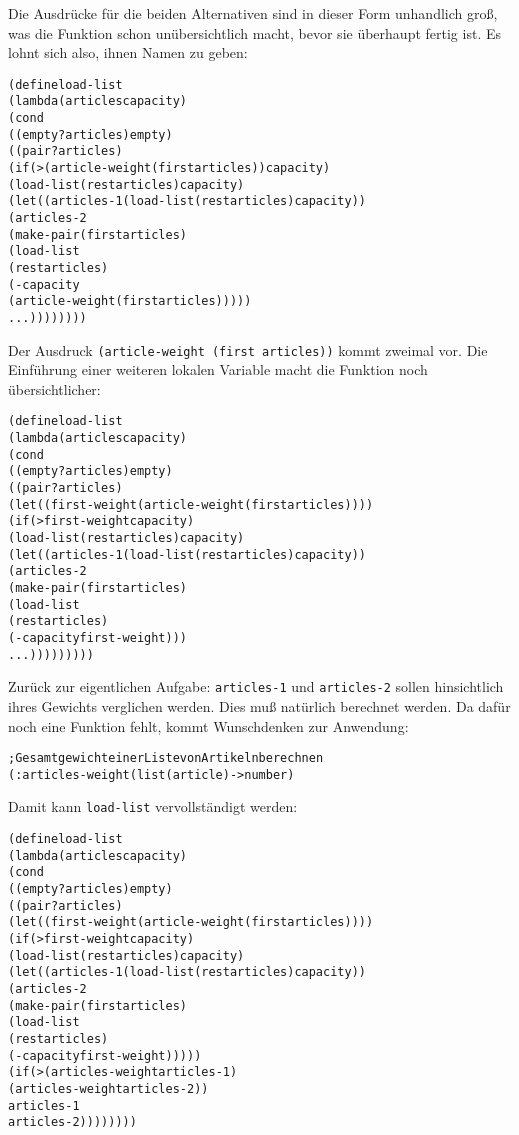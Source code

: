 %
Die Ausdrücke für die beiden Alternativen sind in dieser Form 
unhandlich groß, was die Funktion schon unübersichtlich macht, bevor
sie überhaupt fertig ist.
Es lohnt sich also, ihnen Namen zu geben:
%
\begin{alltt}
(define load-list
  (lambda (articles capacity)
    (cond
     ((empty? articles) empty)
     ((pair? articles)
        (if (> (article-weight (first articles)) capacity)
            (load-list (rest articles) capacity)
            (let ((articles-1 (load-list (rest articles) capacity))
                  (articles-2
                    (make-pair (first articles)
                               (load-list
                                 (rest articles)
                                 (- capacity 
                                    (article-weight (first articles)))))
              ...))))))))
\end{alltt}
%
Der Ausdruck
\texttt{(article-weight (first articles))} kommt zweimal vor.  Die Einführung einer
weiteren lokalen Variable macht die Funktion noch übersichtlicher:
%
\begin{alltt}
(define load-list
  (lambda (articles capacity)
    (cond
     ((empty? articles) empty)
     ((pair? articles)
      (let ((first-weight (article-weight (first articles))))
        (if (> first-weight capacity)
            (load-list (rest articles) capacity)
            (let ((articles-1 (load-list (rest articles) capacity))
                  (articles-2
                    (make-pair (first articles)
                               (load-list
                                 (rest articles)
                                 (- capacity first-weight)))
              ...)))))))))
\end{alltt}
%
Zurück zur eigentlichen Aufgabe: \texttt{articles-1} und
\texttt{articles-2} sollen hinsichtlich ihres Gewichts verglichen werden.
Dies muß natürlich berechnet werden.  Da dafür noch eine Funktion
fehlt, kommt Wunschdenken zur Anwendung:
%
\begin{alltt}
; Gesamtgewicht einer Liste von Artikeln berechnen
(: articles-weight (list(article) -> number)
\end{alltt}
% 
Damit kann \texttt{load-list} vervollständigt werden:
%
\begin{alltt}
(define load-list
  (lambda (articles capacity)
    (cond
     ((empty? articles) empty)
     ((pair? articles)
      (let ((first-weight (article-weight (first articles))))
        (if (> first-weight capacity)
            (load-list (rest articles) capacity)
            (let ((articles-1 (load-list (rest articles) capacity))
                  (articles-2
                   (make-pair (first articles)
                              (load-list
                                (rest articles) 
                                (- capacity first-weight)))))
              (if (> (articles-weight articles-1)
                     (articles-weight articles-2))
                  articles-1
                  articles-2))))))))
\end{alltt}
